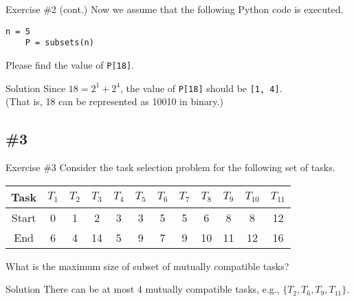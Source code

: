 \documentclass{beamer}
\begin{document}
\begin{frame}[fragile]{Exercise \#2 (cont.)}
  Now we assume that the following Python code is executed.
  \begin{block}{}
    \scriptsize
    \begin{lstlisting}[gobble=4]
    n = 5
    P = subsets(n)
    \end{lstlisting}
  \end{block}
  Please find the value of \lstinline{P[18]}. \pause
  \begin{block}{Solution}
    Since $18 = 2^1 + 2^4$, the value of \lstinline{P[18]} should be
    \lstinline{[1, 4]}. \\
    (That is, 18 can be represented as 10010 in binary.)
  \end{block}
\end{frame}

\subsection{\#3}
\begin{frame}{Exercise \#3}
  Consider the task selection problem for the following set of tasks.
  \begin{center}
    \begin{tabular}{c|ccccccccccc}
      Task & $T_1$ & $T_2$ & $T_3$ & $T_4$ & $T_5$ & $T_6$ & $T_7$ & $T_8$ &
             $T_9$ & $T_{10}$ & $T_{11}$ \\
      \hline
      Start & 0 & 1 & 2 & 3 & 3 & 5 & 5 & 6 & 8 & 8 & 12 \\
      End & 6 & 4 & 14 & 5 & 9 & 7 & 9 & 10 & 11 & 12 & 16 \\
    \end{tabular}
  \end{center}
  What is the maximum size of subset of mutually compatible tasks? \pause
  \begin{block}{Solution}
    There can be at most 4 mutually compatible tasks, e.g.,
    $\{T_2, T_6, T_9, T_{11}\}$.
  \end{block}
\end{frame}
\end{document}
